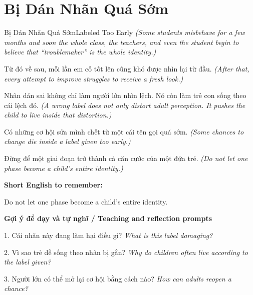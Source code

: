 \section{Bị Dán Nhãn Quá Sớm}
\begin{truyen}{Bị Dán Nhãn Quá Sớm}{Labeled Too Early}
\textit{(Some students misbehave for a few months and soon the whole class, the teachers, and even the student begin to believe that “troublemaker” is the whole identity.)}

Từ đó về sau, mỗi lần em cố tốt lên cũng khó được nhìn lại từ đầu.
\textit{(After that, every attempt to improve struggles to receive a fresh look.)}

Nhãn dán sai không chỉ làm người lớn nhìn lệch. Nó còn làm trẻ con sống theo cái lệch đó.
\textit{(A wrong label does not only distort adult perception. It pushes the child to live inside that distortion.)}

Có những cơ hội sửa mình chết từ một cái tên gọi quá sớm.
\textit{(Some chances to change die inside a label given too early.)}

\end{truyen}

\begin{baihoc}
Đừng để một giai đoạn trở thành cả căn cước của một đứa trẻ.
\textit{(Do not let one phase become a child’s entire identity.)}
\end{baihoc}

\begin{ghinhoanh}
\textbf{Short English to remember:}

Do not let one phase become a child’s entire identity.

\end{ghinhoanh}

\begin{tuhocnhanh}
\textbf{Gợi ý để dạy và tự nghĩ / Teaching and reflection prompts}

1. Cái nhãn này đang làm hại điều gì? \textit{What is this label damaging?}

2. Vì sao trẻ dễ sống theo nhãn bị gắn? \textit{Why do children often live according to the label given?}

3. Người lớn có thể mở lại cơ hội bằng cách nào? \textit{How can adults reopen a chance?}
\end{tuhocnhanh}
\ngancach

